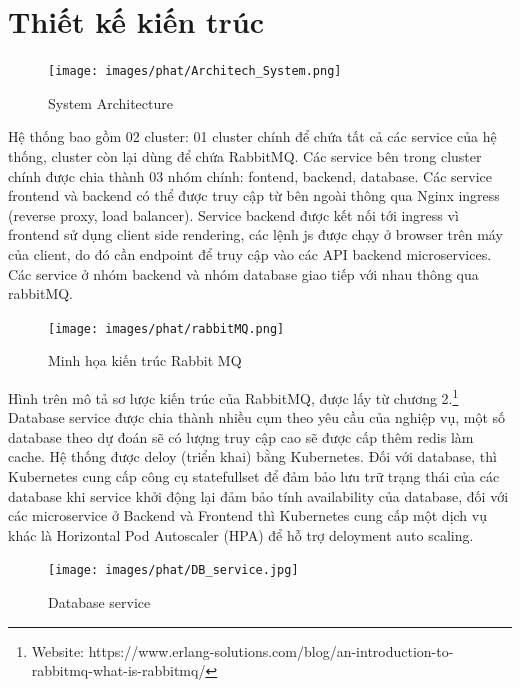 \section{Thiết kế kiến trúc}
 \begin{figure}[H]
    \begin{center}
    \texttt{[image: images/phat/Architech\_System.png]}
    \vspace*{7mm}
    \caption{System Architecture}
    \end{center}
    \label{}
\end{figure}
\noindent Hệ thống bao gồm 02 cluster: 01 cluster chính để chứa tất cả các service của hệ thống, cluster còn lại dùng để chứa RabbitMQ. Các service bên trong cluster chính được chia thành 03 nhóm chính: fontend, backend, database. Các service frontend và backend có thể được truy cập từ bên ngoài thông qua Nginx ingress (reverse proxy, load balancer). Service backend được kết nối tới ingress vì frontend sử dụng client side rendering, các lệnh js được chạy ở browser trên máy của client, do đó cần endpoint để truy cập vào các API backend microservices. Các service ở nhóm backend và nhóm database giao tiếp với nhau thông qua rabbitMQ.
\begin{figure}[H]
    \begin{center}
    \texttt{[image: images/phat/rabbitMQ.png]}
    \vspace*{7mm}
    \caption{Minh họa kiến trúc Rabbit MQ}
    \end{center}
    \label{}
\end{figure}
\noindent Hình trên mô tả sơ lược kiến trúc của RabbitMQ, được lấy từ chương 2.\footnote{Website: https://www.erlang-solutions.com/blog/an-introduction-to-rabbitmq-what-is-rabbitmq/}\\[0.5cm]
\noindent Database service được chia thành nhiều cụm theo yêu cầu của nghiệp vụ, một số database theo dự đoán sẽ có lượng truy cập cao sẽ được cấp thêm redis làm cache. Hệ thống được deloy (triển khai) bằng Kubernetes. Đối với database, thì Kubernetes cung cấp công cụ statefullset để đảm bảo lưu trữ trạng thái của các database khi service khởi động lại đảm bảo tính availability của database, đối với các microservice ở Backend và Frontend thì Kubernetes cung cấp một dịch vụ khác là Horizontal Pod Autoscaler (HPA) để hỗ trợ deloyment auto scaling.
 \begin{figure}[H]
    \begin{center}
    \texttt{[image: images/phat/DB\_service.jpg]}
    \vspace*{7mm}
    \caption{Database service}
    \end{center}
    \label{}
\end{figure}
